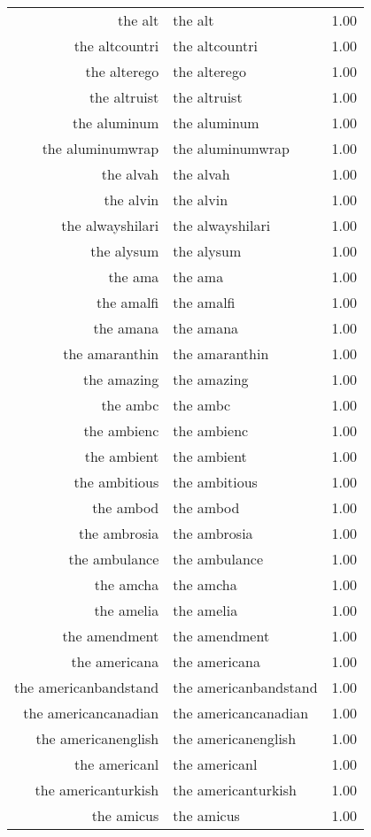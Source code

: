 \begin{table}[ht]
\begin{tabular}{rlr}
  the alt & the alt & 1.00 \\ 
  the altcountri & the altcountri & 1.00 \\ 
  the alterego & the alterego & 1.00 \\ 
  the altruist & the altruist & 1.00 \\ 
  the aluminum & the aluminum & 1.00 \\ 
  the aluminumwrap & the aluminumwrap & 1.00 \\ 
  the alvah & the alvah & 1.00 \\ 
  the alvin & the alvin & 1.00 \\ 
  the alwayshilari & the alwayshilari & 1.00 \\ 
  the alysum & the alysum & 1.00 \\ 
  the ama & the ama & 1.00 \\ 
  the amalfi & the amalfi & 1.00 \\ 
  the amana & the amana & 1.00 \\ 
  the amaranthin & the amaranthin & 1.00 \\ 
  the amazing & the amazing & 1.00 \\ 
  the ambc & the ambc & 1.00 \\ 
  the ambienc & the ambienc & 1.00 \\ 
  the ambient & the ambient & 1.00 \\ 
  the ambitious & the ambitious & 1.00 \\ 
  the ambod & the ambod & 1.00 \\ 
  the ambrosia & the ambrosia & 1.00 \\ 
  the ambulance & the ambulance & 1.00 \\ 
  the amcha & the amcha & 1.00 \\ 
  the amelia & the amelia & 1.00 \\ 
  the amendment & the amendment & 1.00 \\ 
  the americana & the americana & 1.00 \\ 
  the americanbandstand & the americanbandstand & 1.00 \\ 
  the americancanadian & the americancanadian & 1.00 \\ 
  the americanenglish & the americanenglish & 1.00 \\ 
  the americanl & the americanl & 1.00 \\ 
  the americanturkish & the americanturkish & 1.00 \\ 
  the amicus & the amicus & 1.00 \\ 

\end{tabular}
\end{table}
